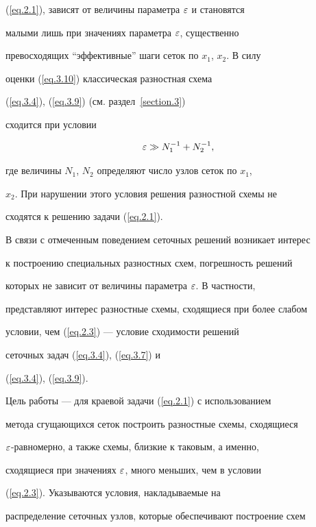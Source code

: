 (\ref{eq.2.1}), зависят от величины параметра $\varepsilon$ и становятся


малыми лишь при значениях параметра $\varepsilon$, существенно


превосходящих ``эффективные'' шаги сеток по $x_1$, $x_2$. В силу


оценки (\ref{eq.3.10}) классическая разностная схема


(\ref{eq.3.4}), (\ref{eq.3.9}) (см. раздел~\ref{section.3})


сходится при условии


\begin{equation}\label{eq.2.3}


\eps\gg N_1^{-1}+N_2^{-1},


\end{equation}


где величины $N_1$, $N_2$ определяют число узлов сеток по $x_1$,


$x_2$. При нарушении этого условия решения разностной схемы не


сходятся к решению задачи (\ref{eq.2.1}).





В связи с отмеченным поведением сеточных решений возникает интерес


к построению специальных разностных схем, погрешность решений


которых не зависит от величины параметра $\varepsilon$. В частности,


представляют интерес разностные схемы, сходящиеся при более слабом


условии, чем (\ref{eq.2.3}) --- условие сходимости решений


сеточных задач (\ref{eq.3.4}), (\ref{eq.3.7}) и


(\ref{eq.3.4}), (\ref{eq.3.9}).





Цель работы --- для краевой задачи (\ref{eq.2.1}) с использованием


метода сгущающихся сеток построить разностные схемы, сходящиеся


$\varepsilon$-равномерно, а также схемы, близкие к таковым, а именно,


сходящиеся при значениях $\varepsilon$, много меньших, чем в условии


(\ref{eq.2.3}). Указываются условия, накладываемые на


распределение сеточных узлов, которые обеспечивают построение схем


